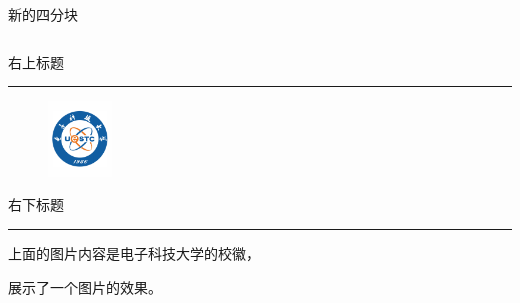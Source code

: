 \documentclass[aspectratio=169]{beamer}
\begin{document}
\begin{frame}{新的四分块}
\begin{columns}[t]
        \begin{column}{0.5\textwidth}
            \begin{minipage}[t]{\linewidth}
                \fbtitlefont
                右上标题\par
                \vspace{-0.5em}
                \textcolor{uestc}{\rule{\linewidth}{0.5pt}}\par
                \vspace{0.5em}
                \fbfont %
                \begin{figure}
                    \centering
                    \includegraphics[height=2cm]{logo.pdf}
                    \label{fig:four-block-fig}
                \end{figure}
            \end{minipage}
        
            \vspace{1em}
        
            \begin{minipage}{\linewidth}
                \fbtitlefont
                右下标题\par
                \vspace{-0.5em}
                \textcolor{uestc}{\rule{\linewidth}{0.5pt}}\par
                \vspace{0.5em}
                \fbfont %
                上面的图片内容是电子科技大学的校徽，

                展示了一个图片的效果。
            \end{minipage}
        \end{column}
    \end{columns}
    
    \endgroup
\end{frame}
\end{document}
